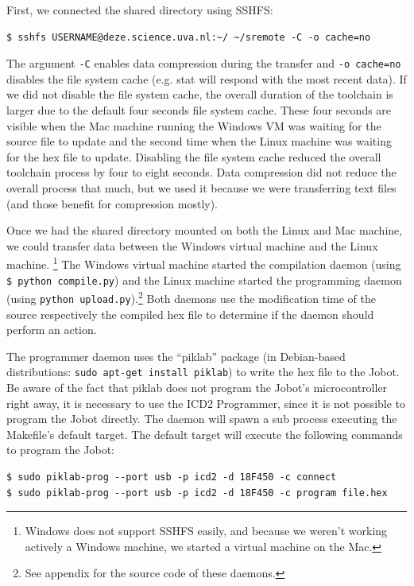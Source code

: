 \documentclass[a4paper,10pt]{article} %
\begin{document}
\noindent First, we connected the shared directory using SSHFS:

\begin{verbatim}
$ sshfs USERNAME@deze.science.uva.nl:~/ ~/sremote -C -o cache=no
\end{verbatim}

The argument \texttt{-C} enables data compression during the transfer and
\texttt{-o cache=no} disables the file system cache (e.g. stat will respond with
the most recent data). If we did not disable the file system cache, the overall
duration of the toolchain is larger due to the default four seconds file system
cache. These four seconds are visible when the Mac machine running the Windows
VM was waiting for the source file to update and the second time when the Linux
machine was waiting for the hex file to update. Disabling the file system cache
reduced the overall toolchain process by four to eight seconds. Data compression
did not reduce the overall process that much, but we used it because we were
transferring text files (and those benefit for compression mostly).

Once we had the shared directory mounted on both the Linux and Mac machine, we
could transfer data between the Windows virtual machine and the Linux machine.
\footnote{Windows does not support SSHFS easily, and because we weren't working
actively a Windows machine, we started a virtual machine on the Mac.} The
Windows virtual machine started the compilation daemon (using \texttt{\$ python
compile.py}) and the Linux machine started the programming daemon (using
\texttt{python upload.py}).\footnote{See appendix for the source code of these
daemons.} Both daemons use the modification time of the source respectively the
compiled hex file to determine if the daemon should perform an action.

The programmer daemon uses the ``piklab'' package (in Debian-based
distributions: \texttt{sudo apt-get install piklab}) to write the hex file to
the Jobot. Be aware of the fact that piklab does not program the Jobot's
microcontroller right away, it is necessary to use the ICD2 Programmer, since
it is not possible to program the Jobot directly. The daemon will spawn a
sub process executing the Makefile's default target. The default target will
execute the following commands to program the Jobot:

\begin{verbatim}
$ sudo piklab-prog --port usb -p icd2 -d 18F450 -c connect
$ sudo piklab-prog --port usb -p icd2 -d 18F450 -c program file.hex
\end{verbatim}
\end{document}
